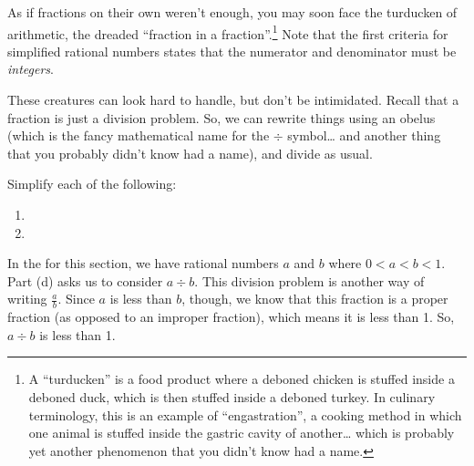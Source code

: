 As if fractions on their own weren't enough, you may soon face the turducken of arithmetic, the dreaded ``fraction in a fraction''.\footnote{A ``turducken'' is a food product where a deboned chicken is stuffed inside a deboned duck, which is then stuffed inside a deboned turkey. In culinary terminology, this is an example of ``engastration'', a cooking method in which one animal is stuffed inside the gastric cavity of another\ldots{} which is probably yet another phenomenon that you didn't know had a name.} Note that the first criteria for simplified rational numbers states that the numerator and denominator must be {\em integers}.

These creatures can look hard to handle, but don't be intimidated. Recall that a fraction is just a division problem. So, we can rewrite things using an \gls{obelus} (which is the fancy mathematical name for the $\div$ symbol\ldots{} and another thing that you probably didn't know had a name), and divide as usual.

\begin{boxedex}
Simplify each of the following:

\bigskip\begin{enumerate}[itemsep=10pt]
\item {}

\item {}
\end{enumerate}
\end{boxedex}

\begin{boxedex}
In the  for this section, we have rational numbers $a$ and $b$ where $0 < a < b < 1$. Part (d) asks us to consider $a \div b$. This division problem is another way of writing $\frac{a}{b}$. Since $a$ is less than $b$, though, we know that this fraction is a proper fraction (as opposed to an improper fraction), which means it is less than 1. So, $a \div b$ is less than 1.
\end{boxedex}

